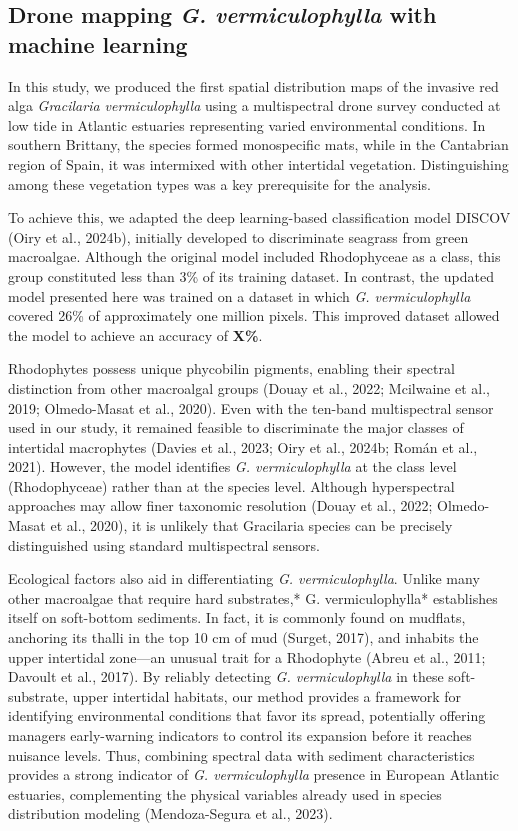 \documentclass[
  letterpaper,
  DIV=11,
  numbers=noendperiod]{scrartcl}
\begin{document}
\subsection{\texorpdfstring{Drone mapping \emph{G. vermiculophylla} with
machine
learning}{Drone mapping G. vermiculophylla with machine learning}}\label{drone-mapping-g.-vermiculophylla-with-machine-learning}

In this study, we produced the first spatial distribution maps of the
invasive red alga \emph{Gracilaria vermiculophylla} using a
multispectral drone survey conducted at low tide in Atlantic estuaries
representing varied environmental conditions. In southern Brittany, the
species formed monospecific mats, while in the Cantabrian region of
Spain, it was intermixed with other intertidal vegetation.
Distinguishing among these vegetation types was a key prerequisite for
the analysis.

To achieve this, we adapted the deep learning-based classification model
DISCOV (Oiry et al., 2024b), initially developed to discriminate
seagrass from green macroalgae. Although the original model included
Rhodophyceae as a class, this group constituted less than 3\% of its
training dataset. In contrast, the updated model presented here was
trained on a dataset in which \emph{G. vermiculophylla} covered 26\% of
approximately one million pixels. This improved dataset allowed the
model to achieve an accuracy of \textbf{X\%}.

Rhodophytes possess unique phycobilin pigments, enabling their spectral
distinction from other macroalgal groups (Douay et al., 2022; Mcilwaine
et al., 2019; Olmedo-Masat et al., 2020). Even with the ten-band
multispectral sensor used in our study, it remained feasible to
discriminate the major classes of intertidal macrophytes (Davies et al.,
2023; Oiry et al., 2024b; Román et al., 2021). However, the model
identifies \emph{G. vermiculophylla} at the class level (Rhodophyceae)
rather than at the species level. Although hyperspectral approaches may
allow finer taxonomic resolution (Douay et al., 2022; Olmedo-Masat et
al., 2020), it is unlikely that Gracilaria species can be precisely
distinguished using standard multispectral sensors.

Ecological factors also aid in differentiating \emph{G.
vermiculophylla}. Unlike many other macroalgae that require hard
substrates,* G. vermiculophylla* establishes itself on soft-bottom
sediments. In fact, it is commonly found on mudflats, anchoring its
thalli in the top 10 cm of mud (Surget, 2017), and inhabits the upper
intertidal zone---an unusual trait for a Rhodophyte (Abreu et al., 2011;
Davoult et al., 2017). By reliably detecting \emph{G. vermiculophylla}
in these soft-substrate, upper intertidal habitats, our method provides
a framework for identifying environmental conditions that favor its
spread, potentially offering managers early-warning indicators to
control its expansion before it reaches nuisance levels. Thus, combining
spectral data with sediment characteristics provides a strong indicator
of \emph{G. vermiculophylla} presence in European Atlantic estuaries,
complementing the physical variables already used in species
distribution modeling (Mendoza-Segura et al., 2023).
\end{document}
